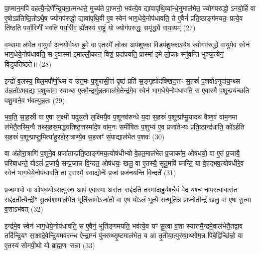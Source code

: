 पा॒प्मान॒मपि॑ दहत्यै॒न्द्रेणे᳚न्द्रि॒यमा॒त्मन्ध॑त्ते॒ मुच्य॑ते पा॒प्मनो॒ भव॑त्ये॒व द्या॑वापृथि॒व्या᳚न्धे॒नुमाल॑भेत॒ ज्योग॑परुद्धो॒ \-ऽनयो॒र्\mbox{}हि वा ए॒षो\-ऽप्र॑तिष्ठि॒तो\-ऽथै॒ष ज्योगप॑रुद्धो॒ द्यावा॑पृथि॒वी ए॒व स्वेन॑ भाग॒धेये॒नोप॑धावति॒ ते ए॒वैनं॑ प्रति॒ष्ठाङ्ग॑मयतः॒ प्रत्ये॒व ति॑ष्ठति पर्या॒रिणी॑ भवति पर्या॒रीव॒ ह्ये॑तस्य॑ रा॒ष्ट्रं यो ज्योग॑परुद्धः॒ समृ॑द्ध्यै वाय॒व्यम्᳚ (27)

व॒थ्समा ल॑भेत वा॒युर्वा अ॒नयो᳚र्व॒थ्स इ॒मे वा ए॒तस्मै॑ लो॒का अप॑शुष्का॒ विडप॑शु॒ष्का\-ऽथै॒ष ज्योगप॑रुद्धो वा॒युमे॒व स्वेन॑ भाग॒धेये॒नोप॑धावति॒ स ए॒वास्मा॑ इ॒माल्लोँ॒काऩ् विशं॒ प्रदा॑पयति॒ प्रास्मा॑ इ॒मे लो॒काः स्नु॑वन्ति भुञ्ज॒त्ये॑नं॒ विडुप॑तिष्ठते॥ (28)

{\anuvakamend[{म॒द्ध्यन्दि॑ने॒ कद्रुं॑ य॒मस्य॒ स्पर्द्ध॑मानो वैष्णावरु॒णीन्तमिन्द्रो᳚\-ऽस्य॒ स्वेन॑ भाग॒धेये॒नोप॑सृतो वाय॒व्यं॑ द्विच॑त्वारिꣳशच्च। (4)।}]}

इन्द्रो॑ व॒लस्य॒ बिल॒मपौ᳚र्णो॒थ्स य उ॑त्त॒मः प॒शुरासी॒त्तं पृ॒ष्ठं प्रति॑ स॒ङ्गृह्योद॑क्खिद॒त्तꣳ स॒हस्रं॑ प॒शवो\-ऽनूदा॑य॒न्थ्स उ॑न्न॒तो॑\-ऽभव॒द्यः प॒शुका॑मः॒ स्याथ्स ए॒तमै॒न्द्रमु॑न्न॒तमाल॑भे॒तेन्द्र॑मे॒व स्वेन॑ भाग॒धेये॒नोप॑धावति॒ स ए॒वास्मै॑ प॒शून्प्रय॑च्छति पशु॒माने॒व भ॑वत्युन्न॒तः (29)

भ॒व॒ति॒ सा॒ह॒स्री वा ए॒षा ल॒क्ष्मी यदु॑न्न॒तो ल॒क्ष्मियै॒व प॒शूनव॑रुन्धे य॒दा स॒हस्रं॑ प॒शून्प्रा᳚प्मु॒यादथ॑ वैष्ण॒वं वा॑म॒नमा ल॑भेतै॒तस्मि॒न्वै तथ्स॒हस्र॒मद्ध्य॑तिष्ठ॒त्तस्मा॑दे॒ष वा॑म॒नः समी॑षितः प॒शुभ्य॑ ए॒व प्रजा॑तेभ्यः प्रति॒ष्ठान्द॑धाति॒ को॑\-ऽर्\mbox{}हति स॒हस्रं॑ प॒शून्प्राप्तु॒मित्या॑हुरहोरा॒त्राण्ये॒व स॒हस्रꣳ॑ सं॒पाद्याल॑भेत प॒शवः॑ (30)

वा अ॑होरा॒त्राणि॑ प॒शूने॒व प्रजा॑तान्प्रति॒ष्ठाङ्ग॑मय॒त्योष॑धीभ्यो वे॒हत॒माल॑भेत प्र॒जाका॑म॒ ओष॑धयो॒ वा ए॒तं प्र॒जायै॒ परि॑बाधन्ते॒ यो\-ऽलं॑ प्र॒जायै॒ सन्प्र॒जान्न वि॒न्दत॒ ओष॑धयः॒ खलु॒ वा ए॒तस्यै॒ सूतु॒मपि॑ घ्नन्ति॒ या वे॒हद्भव॒त्योष॑धीरे॒व स्वेन॑ भाग॒धेये॒नोप॑धावति॒ ता ए॒वास्मै॒ स्वाद्योनेः᳚ प्र॒जां प्रज॑नयन्ति वि॒न्दते᳚ (31)

प्र॒जामापो॒ वा ओष॑ध॒यो\-ऽस॒त्पुरु॑ष॒ आप॑ ए॒वास्मा॒ अस॑तः॒ सद्द॑दति॒ तस्मा॑दाहु॒र्यश्चै॒वं वेद॒ यश्च॒ नाप॒स्त्वावास॑त॒ सद्द॑द॒तीत्यै॒न्द्रीꣳ सू॒तव॑शा॒माल॑भेत॒ भूति॑का॒मो\-ऽजा॑तो॒ वा ए॒ष यो\-ऽलं॒ भूत्यै॒ सन्भूति॒न्न प्रा॒प्नोतीन्द्रं॒ खलु॒ वा ए॒षा सू॒त्वा व॒शा\-ऽभ॑वत् (32)

इन्द्र॑मे॒व स्वेन॑ भाग॒धेये॒नोप॑धावति॒ स ए॒वैनं॒ भूति॑ङ्गमयति॒ भव॑त्ये॒व यꣳ सू॒त्वा व॒शा स्यात्तमै॒न्द्रमे॒वाल॑भेतै॒तद्वाव तदि॑न्द्रि॒यꣳ सा॒क्षादे॒वेन्द्रि॒यमव॑रुन्ध ऐन्द्रा॒ग्नं पु॑नरुथ्सृ॒ष्टमाल॑भेत॒ य आ तृ॒तीया॒त्पुरु॑षा॒थ्सोम॒न्न पिबे॒द्विच्छि॑न्नो॒ वा ए॒तस्य॑ सोमपी॒थो यो ब्रा᳚ह्म॒णः सन्ना (33)

